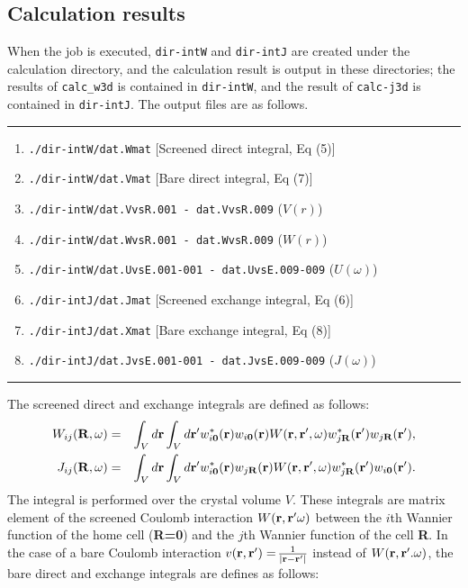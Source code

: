 \documentclass{article}
\begin{document}
\subsection{\label{result-calc-int}Calculation results}
When the job is executed, \verb+dir-intW+ and \verb+dir-intJ+ are created under the calculation directory, and the calculation result is output in these directories; the results of \verb+calc_w3d+ is contained in \verb+dir-intW+, and the result of \verb+calc-j3d+ is contained in \verb+dir-intJ+. The output files are as follows.
\vspace{3mm}\hrule
\begin{enumerate}
\item \verb+./dir-intW/dat.Wmat+ [Screened direct integral, Eq (5)]
\item \verb+./dir-intW/dat.Vmat+ [Bare direct integral, Eq (7)] 
\item \verb+./dir-intW/dat.VvsR.001 - dat.VvsR.009+ ($V(r)$) 
\item \verb+./dir-intW/dat.WvsR.001 - dat.WvsR.009+ ($W(r)$)
\item \verb+./dir-intW/dat.UvsE.001-001 - dat.UvsE.009-009+ ($U(\omega)$)
\item \verb+./dir-intJ/dat.Jmat+ [Screened exchange integral, Eq (6)] 
\item \verb+./dir-intJ/dat.Xmat+ [Bare exchange integral, Eq (8)]
\item \verb+./dir-intJ/dat.JvsE.001-001 - dat.JvsE.009-009+ ($J(\omega)$)
\end{enumerate}
\hrule\vspace{3mm}
The screened direct and exchange integrals are defined as follows:  
\begin{eqnarray}
W_{ij}({\bf R},\omega)&=&\int_V d{\bf r} \int_V  d{\bf r'}
w_{i{\bf 0}}^*({\bf r}) 
w_{i{\bf 0}}({\bf r}) 
W({\bf r,r'},\omega) 
w_{j{\bf R}}^*({\bf r'}) 
w_{j{\bf R}}({\bf r'}), \label{Wij} \\
J_{ij}({\bf R},\omega)&=&\int_V  d{\bf r}\int_V d{\bf r'}
w_{i{\bf 0}}^*({\bf r}) 
w_{j{\bf R}}({\bf r}) 
W({\bf r,r'},\omega) 
w_{j{\bf R}}^*({\bf r'}) 
w_{i{\bf 0}}({\bf r'}). \label{Jij}
\end{eqnarray}
The integral is performed over the crystal volume $V$. These integrals are matrix element of the screened Coulomb interaction $W({\bf r,r'} \omega)$ between the $i$th Wannier function of the home cell ({\bf R=0}) and the $j$th Wannier function of the cell {\bf R}. In the case of a bare Coulomb interaction $v({\bf r,r'})=${\Large $\frac{1}{|{\bf r-r'}|}$} instead of $W({\bf r,r'}.\omega)$, the bare direct and exchange integrals are defines as follows:
\end{document}
